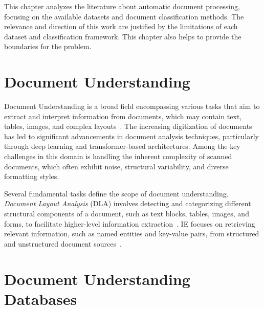 This chapter analyzes the literature about automatic document processing, focusing on the available datasets and document classification methods. The relevance and direction of this work are justified by the limitations of each dataset and classification framework. This chapter also helps to provide the boundaries for the problem.

\section{Document Understanding}

Document Understanding is a broad field encompassing various tasks that aim to extract and interpret information from documents, which may contain text, tables, images, and complex layouts~\cite{abdallah_survey_2024}. The increasing digitization of documents has led to significant advancements in document analysis techniques, particularly through deep learning and transformer-based architectures. Among the key challenges in this domain is handling the inherent complexity of scanned documents, which often exhibit noise, structural variability, and diverse formatting styles.

Several fundamental tasks define the scope of document understanding. \textit{Document Layout Analysis} (DLA) involves detecting and categorizing different structural components of a document, such as text blocks, tables, images, and forms, to facilitate higher-level information extraction~\cite{zhong_publaynet_2019}. \gls{IE} focuses on retrieving relevant information, such as named entities and key-value pairs, from structured and unstructured document sources~\cite{abdallah_survey_2024}. 


\section{Document Understanding Databases}

